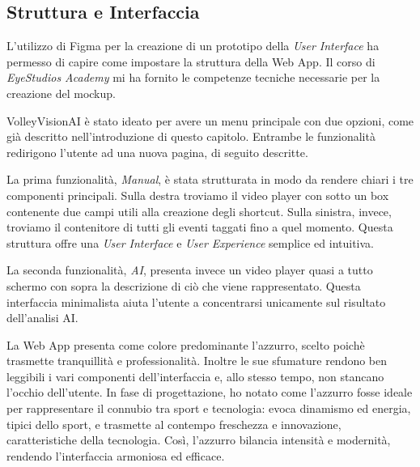 \subsection{Struttura e Interfaccia}
\label{subsec:interfaccia}

L'utilizzo di Figma per la creazione di un prototipo della \textit{User Interface} ha permesso di capire come impostare la struttura della Web App. Il corso di \textit{EyeStudios Academy} mi ha fornito le competenze tecniche necessarie per la creazione del mockup.

VolleyVisionAI è stato ideato per avere un menu principale con due opzioni, come già descritto nell'introduzione di questo capitolo. Entrambe le funzionalità redirigono l'utente ad una nuova pagina, di seguito descritte.

La prima funzionalità, \textit{Manual}, è stata strutturata in modo da rendere chiari i tre componenti principali. Sulla destra troviamo il video player con sotto un box contenente due campi utili alla creazione degli shortcut. Sulla sinistra, invece, troviamo il contenitore di tutti gli eventi taggati fino a quel momento. Questa struttura offre una \textit{User Interface} e \textit{User Experience} semplice ed intuitiva. 

La seconda funzionalità, \textit{AI}, presenta invece un video player quasi a tutto schermo con sopra la descrizione di ciò che viene rappresentato. Questa interfaccia minimalista aiuta l'utente a concentrarsi unicamente sul risultato dell'analisi AI. 

La Web App presenta come colore predominante l'azzurro, scelto poichè trasmette tranquillità e professionalità. Inoltre le sue sfumature rendono ben leggibili i vari componenti dell'interfaccia e, allo stesso tempo, non stancano l'occhio dell'utente. In fase di progettazione, ho notato come l'azzurro fosse ideale per rappresentare il connubio tra sport e tecnologia: evoca dinamismo ed energia, tipici dello sport, e trasmette al contempo freschezza e innovazione, caratteristiche della tecnologia. Così, l'azzurro bilancia intensità e modernità, rendendo l'interfaccia armoniosa ed efficace.

